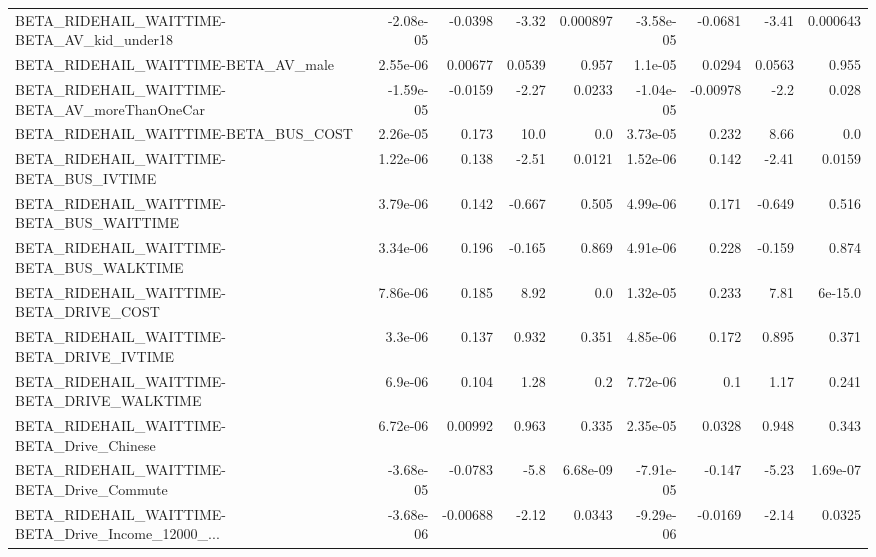 \begin{tabular}{lrrrrrrrr}
BETA\_RIDEHAIL\_WAITTIME-BETA\_AV\_kid\_under18         &   -2.08e-05 &      -0.0398 &     -3.32 & 0.000897 &  -3.58e-05 &     -0.0681 &        -3.41 &      0.000643 \\
BETA\_RIDEHAIL\_WAITTIME-BETA\_AV\_male                &    2.55e-06 &      0.00677 &    0.0539 &    0.957 &    1.1e-05 &      0.0294 &       0.0563 &         0.955 \\
BETA\_RIDEHAIL\_WAITTIME-BETA\_AV\_moreThanOneCar      &   -1.59e-05 &      -0.0159 &     -2.27 &   0.0233 &  -1.04e-05 &    -0.00978 &         -2.2 &         0.028 \\
BETA\_RIDEHAIL\_WAITTIME-BETA\_BUS\_COST               &    2.26e-05 &        0.173 &      10.0 &      0.0 &   3.73e-05 &       0.232 &         8.66 &           0.0 \\
BETA\_RIDEHAIL\_WAITTIME-BETA\_BUS\_IVTIME             &    1.22e-06 &        0.138 &     -2.51 &   0.0121 &   1.52e-06 &       0.142 &        -2.41 &        0.0159 \\
BETA\_RIDEHAIL\_WAITTIME-BETA\_BUS\_WAITTIME           &    3.79e-06 &        0.142 &    -0.667 &    0.505 &   4.99e-06 &       0.171 &       -0.649 &         0.516 \\
BETA\_RIDEHAIL\_WAITTIME-BETA\_BUS\_WALKTIME           &    3.34e-06 &        0.196 &    -0.165 &    0.869 &   4.91e-06 &       0.228 &       -0.159 &         0.874 \\
BETA\_RIDEHAIL\_WAITTIME-BETA\_DRIVE\_COST             &    7.86e-06 &        0.185 &      8.92 &      0.0 &   1.32e-05 &       0.233 &         7.81 &       6e-15.0 \\
BETA\_RIDEHAIL\_WAITTIME-BETA\_DRIVE\_IVTIME           &     3.3e-06 &        0.137 &     0.932 &    0.351 &   4.85e-06 &       0.172 &        0.895 &         0.371 \\
BETA\_RIDEHAIL\_WAITTIME-BETA\_DRIVE\_WALKTIME         &     6.9e-06 &        0.104 &      1.28 &      0.2 &   7.72e-06 &         0.1 &         1.17 &         0.241 \\
BETA\_RIDEHAIL\_WAITTIME-BETA\_Drive\_Chinese          &    6.72e-06 &      0.00992 &     0.963 &    0.335 &   2.35e-05 &      0.0328 &        0.948 &         0.343 \\
BETA\_RIDEHAIL\_WAITTIME-BETA\_Drive\_Commute          &   -3.68e-05 &      -0.0783 &      -5.8 & 6.68e-09 &  -7.91e-05 &      -0.147 &        -5.23 &      1.69e-07 \\
BETA\_RIDEHAIL\_WAITTIME-BETA\_Drive\_Income\_12000\_... &   -3.68e-06 &     -0.00688 &     -2.12 &   0.0343 &  -9.29e-06 &     -0.0169 &        -2.14 &        0.0325 \\

\end{tabular}
